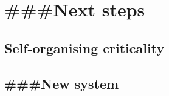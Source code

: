 \documentclass{article}
\numberwithin{equation}{section}
\begin{document}
\section{\#\#\#Next steps}
\subsection{Self-organising criticality}
\subsection{\#\#\#New system}

\printbibliography
\end{document}
